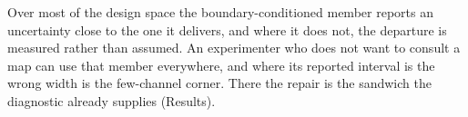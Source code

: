 Over most of the design space the boundary-conditioned member reports an uncertainty close to the one it delivers, and where it does not, the departure is measured rather than assumed.
An experimenter who does not want to consult a map can use that member everywhere, and where its reported interval is the wrong width is the few-channel corner. There the repair is the sandwich the diagnostic already supplies (Results).

